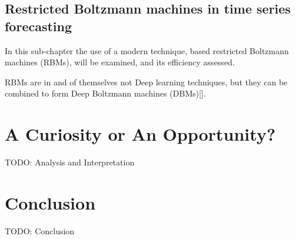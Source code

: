 \subsection{Restricted Boltzmann machines in time series forecasting}

In this sub-chapter the use of a modern technique, based restricted Boltzmann machines (RBMs), will be examined, and its efficiency assessed.

RBMs are in and of themselves not Deep learning techniques, but they can be combined to form Deep Boltzmann machines (DBMs)[].





\newpage

\section{A Curiosity or An Opportunity?}
TODO: Analysis and Interpretation

\newpage

\section{Conclusion}
TODO: Conclusion
